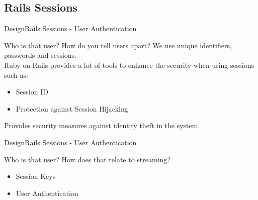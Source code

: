 \subsection{Rails Sessions}
\begin{frame}{Design}{Rails Sessions - User Authentication}
  \begin{block}{Who is that user?}
  	How do you tell users apart? We use unique identifiers, passwords and sessions. \\

  	Ruby on Rails provides a lot of tools to enhance the security when using sessions such as: \\
  	\begin{itemize}
  		\item Session ID
  		\item Protection against Session Hijacking
  	\end{itemize}

  	Provides security measures against identity theft in the system.
  \end{block}
\end{frame}

\begin{frame}{Design}{Rails Sessions - User Authentication}
  \begin{block}{Who is that user?}
  	How does that relate to streaming? \\

  	\begin{itemize}
  		\item Session Keys
  		\item User Authentication
  	\end{itemize}
  \end{block}
\end{frame}


%

